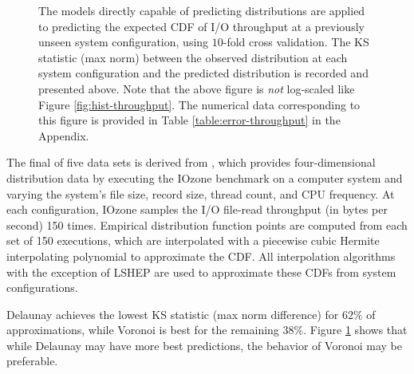 \begin{figure}
  \centering
  \caption{The models directly capable of predicting distributions are
    applied to predicting the expected CDF of I/O throughput at a
    previously unseen system configuration, using $10$-fold cross
    validation. The KS statistic (max norm) between the observed
    distribution at each system configuration and the predicted
    distribution is recorded and presented above. Note that the above
    figure is \textit{not} log-scaled like Figure
    \ref{fig:hist-throughput}. The numerical data corresponding to
    this figure is provided in Table \ref{table:error-throughput} in
    the Appendix.}
  \label{fig:error-throughput}
\end{figure}

The final of five data sets is derived from \cite{cameron2019moana},
which provides four-dimensional distribution data by executing the
IOzone benchmark \cite{iozone} on a computer system and varying the
system's file size, record size, thread count, and CPU frequency. At
each configuration, IOzone samples the I/O file-read throughput (in
bytes per second) 150 times. Empirical distribution function points
are computed from each set of 150 executions, which are interpolated
with a piecewise cubic Hermite interpolating polynomial
\cite{fritsch1980monotone} to approximate the CDF. All interpolation
algorithms with the exception of LSHEP are used to approximate these
CDFs from system configurations.

Delaunay achieves the lowest KS statistic (max norm difference) for
$62\%$ of approximations, while Voronoi is best for the remaining
$38\%$. Figure \ref{fig:error-throughput} shows that while Delaunay
may have more best predictions, the behavior of Voronoi may be
preferable.


